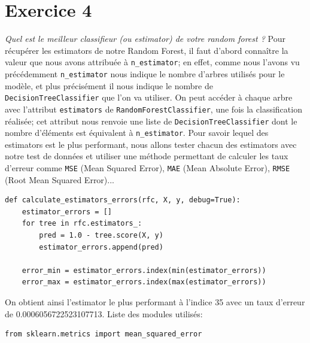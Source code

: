 \documentclass[a4paper, 12pt, oneside]{book}
\begin{document}
\section{Exercice 4}
\textit{Quel est le meilleur classifieur (ou estimator) de votre random forest ?}
\newline \newline
Pour récupérer les estimators de notre Random Forest, il faut d'abord connaître la valeur que nous avons attribuée à \texttt{n\_estimator}; en effet, comme nous l'avons vu précédemment \texttt{n\_estimator} nous indique le nombre d'arbres utilisés pour le modèle, et plus précisément il nous indique le nombre de \texttt{DecisionTreeClassifier} que l'on va utiliser. On peut accéder à chaque arbre avec l'attribut \texttt{estimators} de \texttt{RandomForestClassifier}, une fois la classification réalisée; cet attribut nous renvoie une liste de \texttt{DecisionTreeClassifier} dont le nombre d'éléments est équivalent à \texttt{n\_estimator}. Pour savoir lequel des estimators est le plus performant, nous allons tester chacun des estimators avec notre test de données et utiliser une méthode permettant de calculer les taux d'erreur comme \texttt{MSE} (Mean Squared Error), \texttt{MAE} (Mean Absolute Error), \texttt{RMSE} (Root Mean Squared Error)...
\begin{verbatim}
def calculate_estimators_errors(rfc, X, y, debug=True):
    estimator_errors = []
    for tree in rfc.estimators_:
        pred = 1.0 - tree.score(X, y)
        estimator_errors.append(pred)

    error_min = estimator_errors.index(min(estimator_errors))
    error_max = estimator_errors.index(max(estimator_errors))
\end{verbatim}
On obtient ainsi l'estimator le plus performant à l'indice 35 avec un taux d'erreur de 0.0006056722523107713.
\newline \newline
Liste des modules utilisés:
\begin{verbatim}
from sklearn.metrics import mean_squared_error
\end{verbatim}
\end{document}
